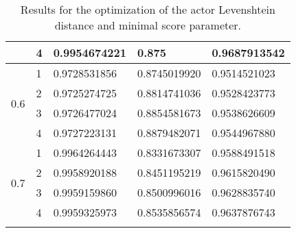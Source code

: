 \begin{longtable}{l|l|l|l|l}
					 & 4 & 0.9954674221 & 0.875        & 0.9687913542 \\ \hline
 \hline
\multirow{4}{*}{0.6} & 1 & 0.9728531856 & 0.8745019920 & 0.9514521023 \\ \hhline{~----}
					 & 2 & 0.9725274725 & 0.8814741036 & 0.9528423773 \\ \hhline{~----}
					 & 3 & 0.9726477024 & 0.8854581673 & 0.9538626609 \\ \hhline{~----}
					 & 4 & 0.9727223131 & 0.8879482071 & 0.9544967880 \\ \hline
 \hline
\multirow{4}{*}{0.7} & 1 & 0.9964264443 & 0.8331673307 & 0.9588491518 \\ \hhline{~----}
					 & 2 & 0.9958920188 & 0.8451195219 & 0.9615820490 \\ \hhline{~----}
					 & 3 & 0.9959159860 & 0.8500996016 & 0.9628835740 \\ \hhline{~----}
					 & 4 & 0.9959325973 & 0.8535856574 & 0.9637876743 \\ \hline

\caption{Results for the optimization of the actor Levenshtein distance and minimal score parameter.}
\label{tab_overlapScore}
\end{longtable}

